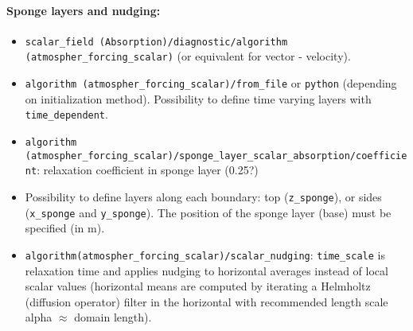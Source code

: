 \documentclass[10pt,a4paper]{article}
\begin{document}
\paragraph{Sponge layers and nudging:}
\begin{itemize}
\item \texttt{scalar\_field (Absorption)/diagnostic/algorithm (atmospher\_forcing\_scalar)} (or equivalent for vector - velocity).
\item \texttt{algorithm (atmospher\_forcing\_scalar)/from\_file} or \texttt{python} (depending on  initialization method). Possibility to define time varying layers with \texttt{time\_dependent}.
\item \texttt{algorithm (atmospher\_forcing\_scalar)/sponge\_layer\_scalar\_absorption/coefficient}: relaxation coefficient in sponge layer (0.25?)
\item Possibility to define layers along each boundary: top (\texttt{z\_sponge}), or sides (\texttt{x\_sponge} and \texttt{y\_sponge}). The position of the sponge layer (base) must be specified (in m).
\item \texttt{algorithm(atmospher\_forcing\_scalar)/scalar\_nudging}: \texttt{time\_scale} is relaxation time and \texttt{} applies nudging to horizontal averages instead of local scalar values (horizontal means are computed by iterating a Helmholtz (diffusion operator) filter in the horizontal with recommended length scale alpha $\approx$ domain length).
\end{itemize}
\end{document}
